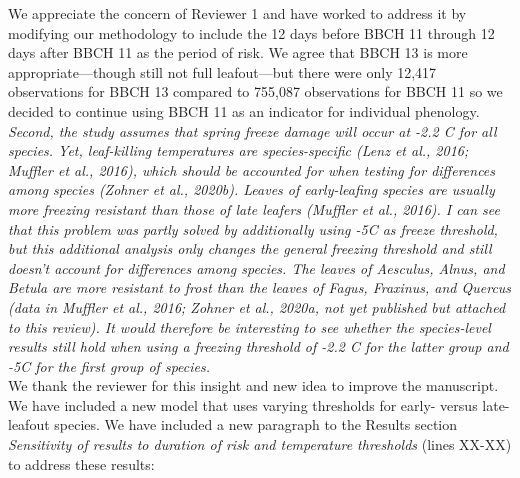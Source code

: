 \documentclass[11pt,a4paper]{article}\usepackage[]{graphicx}\usepackage[]{color}
\begin{document}
We appreciate the concern of Reviewer 1 and have worked to address it by modifying our methodology to include the 12 days before BBCH 11 through 12 days after BBCH 11 as the period of risk. We agree that BBCH 13 is more appropriate---though still not full leafout---but there were only 12,417 observations for BBCH 13 compared to 755,087 observations for BBCH 11 so we decided to continue using BBCH 11 as an indicator for individual phenology. \\

\textit{Second, the study assumes that spring freeze damage will occur at -2.2 C for all species. Yet, leaf-killing temperatures are species-specific (Lenz et al., 2016; Muffler et al., 2016), which should be accounted for when testing for differences among species (Zohner et al., 2020b). Leaves of early-leafing species are usually more freezing resistant than those of late leafers (Muffler et al., 2016). I can see that this problem was partly solved by additionally using -5C as freeze threshold, but this additional analysis only changes the general freezing threshold and still doesn’t account for differences among species. The leaves of Aesculus, Alnus, and Betula are more resistant to frost than the leaves of Fagus, Fraxinus, and Quercus (data in Muffler et al., 2016; Zohner et al., 2020a, not yet published but attached to this review). It would therefore be interesting to see whether the species-level results still hold when using a freezing threshold of -2.2 C for the latter group and -5C for the first group of species.} \\

We thank the reviewer for this insight and new idea to improve the manuscript. We have included a new model that uses varying thresholds for early- versus late-leafout species. We have included a new paragraph to the Results section \textit{Sensitivity of results to duration of risk and temperature thresholds} (lines XX-XX) to address these results: \\
\end{document}
